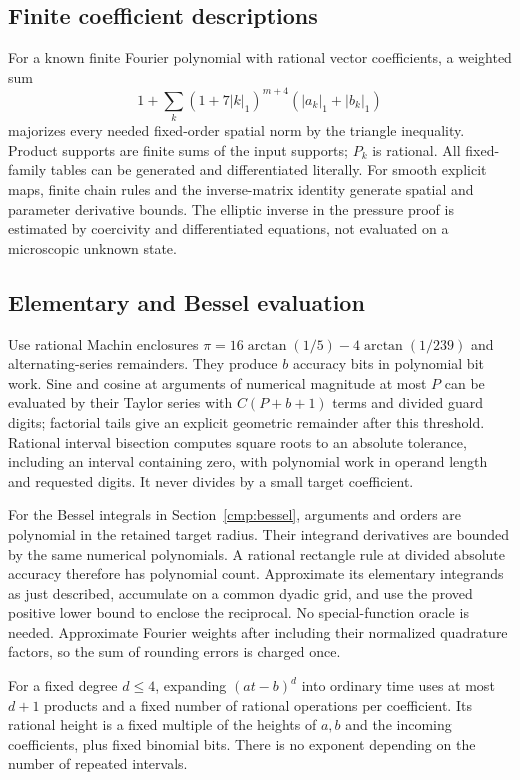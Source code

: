 \documentclass[11pt,a4paper]{amsart}
\theoremstyle{definition}
\theoremstyle{remark}
\numberwithin{equation}{section}
\begin{document}
\subsection{Finite coefficient descriptions}
For a known finite Fourier polynomial with rational vector coefficients, a weighted sum
\[
 1+\sum_k(1+7|k|_1)^{m+4}
          (|a_k|_1+|b_k|_1)
\]
majorizes every needed fixed-order spatial norm by the triangle inequality. Product supports are finite sums of the input supports; $P_k$ is rational. All fixed-family tables can be generated and differentiated literally. For smooth explicit maps, finite chain rules and the inverse-matrix identity generate spatial and parameter derivative bounds. The elliptic inverse in the pressure proof is estimated by coercivity and differentiated equations, not evaluated on a microscopic unknown state.

\subsection{Elementary and Bessel evaluation}
Use rational Machin enclosures
$\pi=16\arctan(1/5)-4\arctan(1/239)$ and alternating-series remainders. They produce $b$ accuracy bits in polynomial bit work. Sine and cosine at arguments of numerical magnitude at most $P$ can be evaluated by their Taylor series with $C(P+b+1)$ terms and divided guard digits; factorial tails give an explicit geometric remainder after this threshold. Rational interval bisection computes square roots to an absolute tolerance, including an interval containing zero, with polynomial work in operand length and requested digits. It never divides by a small target coefficient.

For the Bessel integrals in Section~\ref{cmp:bessel}, arguments and orders are polynomial in the retained target radius. Their integrand derivatives are bounded by the same numerical polynomials. A rational rectangle rule at divided absolute accuracy therefore has polynomial count. Approximate its elementary integrands as just described, accumulate on a common dyadic grid, and use the proved positive lower bound to enclose the reciprocal. No special-function oracle is needed. Approximate Fourier weights after including their normalized quadrature factors, so the sum of rounding errors is charged once.

For a fixed degree $d\le4$, expanding $(at-b)^d$ into ordinary time uses at most $d+1$ products and a fixed number of rational operations per coefficient. Its rational height is a fixed multiple of the heights of $a,b$ and the incoming coefficients, plus fixed binomial bits. There is no exponent depending on the number of repeated intervals.
\end{document}
